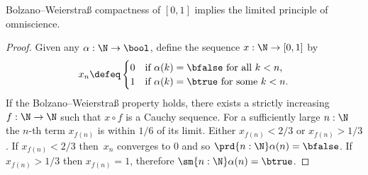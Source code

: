 %
\begin{thm} \label{analysis-bw-lpo}
  Bolzano--Weierstra\ss{} compactness of $[0,1]$ implies the limited principle of omniscience.
\end{thm}

\begin{proof}
  Given any $\alpha : \N \to \bool$, define the sequence $x : \N \to [0,1]$ by
  \begin{equation*}
    x_n \defeq
    \begin{cases}
      0 & \text{if $\alpha(k) = \bfalse$ for all $k < n$,}\\
      1 & \text{if $\alpha(k) = \btrue$ for some $k < n$}.
    \end{cases}
  \end{equation*}
  If the Bolzano--Weierstra\ss{} property holds, there exists a strictly increasing $f : \N \to
  \N$ such that $x \circ f$ is a Cauchy sequence. For a sufficiently large $n :
  \N$ the $n$-th term $x_{f(n)}$ is within $1/6$ of its limit. Either $x_{f(n)} < 2/3$ or
  $x_{f(n)} > 1/3$. If $x_{f(n)} < 2/3$ then~$x_n$ converges to $0$ and so $\prd{n : \N}
  \alpha(n) = \bfalse$. If $x_{f(n)} > 1/3$ then $x_{f(n)} = 1$, therefore $\sm{n : \N}
  \alpha(n) = \btrue$.
\end{proof}
